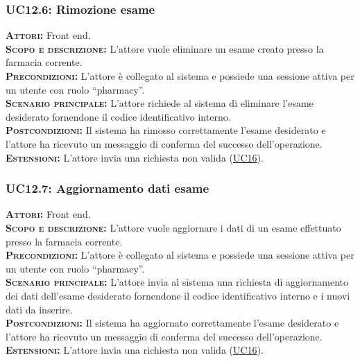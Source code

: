 \subsubsection{UC12.6: Rimozione esame}
\label{sec:UC126}
\textsc{\textbf{Attori:}} Front end.\\
\textsc{\textbf{Scopo e descrizione:}} L'attore vuole eliminare un esame creato presso la farmacia corrente.\\
\textsc{\textsc{\textbf{Precondizioni:}}} L'attore è collegato al sistema e possiede una sessione attiva per un utente con ruolo ``pharmacy''.\\
\textsc{\textbf{Scenario principale:}} L'attore richiede al sistema di eliminare l'esame desiderato fornendone il codice identificativo interno.\\
\textsc{\textbf{Postcondizioni:}} Il sistema ha rimosso correttamente l'esame desiderato e l'attore ha ricevuto un messaggio di conferma del successo dell'operazione.\\
\textsc{\textbf{Estensioni:}} L'attore invia una richiesta non valida (\hyperref[sec:UC16]{UC16}).

\subsubsection{UC12.7: Aggiornamento dati esame}
\label{sec:UC127}
\textsc{\textbf{Attori:}} Front end.\\
\textsc{\textbf{Scopo e descrizione:}} L'attore vuole aggiornare i dati di un esame effettuato presso la farmacia corrente.\\
\textsc{\textsc{\textbf{Precondizioni:}}} L'attore è collegato al sistema e possiede una sessione attiva per un utente con ruolo ``pharmacy''.\\
\textsc{\textbf{Scenario principale:}} L'attore invia al sistema una richiesta di aggiornamento dei dati dell'esame desiderato fornendone il codice identificativo interno e i nuovi dati da inserire.\\
\textsc{\textbf{Postcondizioni:}} Il sistema ha aggiornato correttamente l'esame desiderato e l'attore ha ricevuto un messaggio di conferma del successo dell'operazione.\\
\textsc{\textbf{Estensioni:}} L'attore invia una richiesta non valida (\hyperref[sec:UC16]{UC16}).

